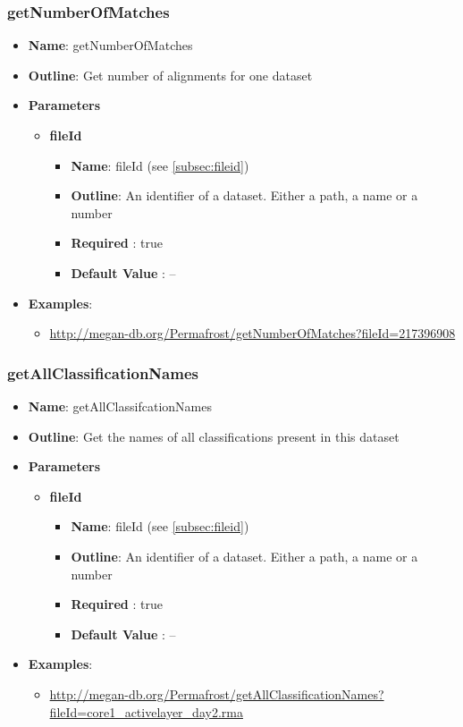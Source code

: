 \documentclass[11pt]{article}
\begin{document}
\subsubsection{getNumberOfMatches}

\begin{itemize}
	\item \textbf{Name}: getNumberOfMatches
	\item \textbf{Outline}: Get number of alignments for one dataset
	\item \textbf{Parameters}
		\begin{itemize}
			\item \textbf{fileId}		
				\begin{itemize}
					\item \textbf{Name}: fileId (see \ref{subsec:fileid})
					\item \textbf{Outline}: An identifier of a dataset. Either a path, a name or a number
					\item \textbf{Required} : true
					\item \textbf{Default Value} : --
				\end{itemize}
		\end{itemize}
	\item \textbf{Examples}:
		\begin{itemize}		
			\item \url{http://megan-db.org/Permafrost/getNumberOfMatches?fileId=217396908}
		\end{itemize}
\end{itemize}


\subsubsection{getAllClassificationNames}
\begin{itemize}
	\item \textbf{Name}: getAllClassifcationNames
	\item \textbf{Outline}: Get the names of all classifications present in this dataset
	\item \textbf{Parameters}
		\begin{itemize}
			\item \textbf{fileId}		
				\begin{itemize}
					\item \textbf{Name}: fileId (see \ref{subsec:fileid})
					\item \textbf{Outline}: An identifier of a dataset. Either a path, a name or a number
					\item \textbf{Required} : true
					\item \textbf{Default Value} : --
				\end{itemize}
		\end{itemize}
	\item \textbf{Examples}:
		\begin{itemize}		
			\item \url{http://megan-db.org/Permafrost/getAllClassificationNames?fileId=core1_activelayer_day2.rma}
		\end{itemize}
\end{itemize}
\end{document}
